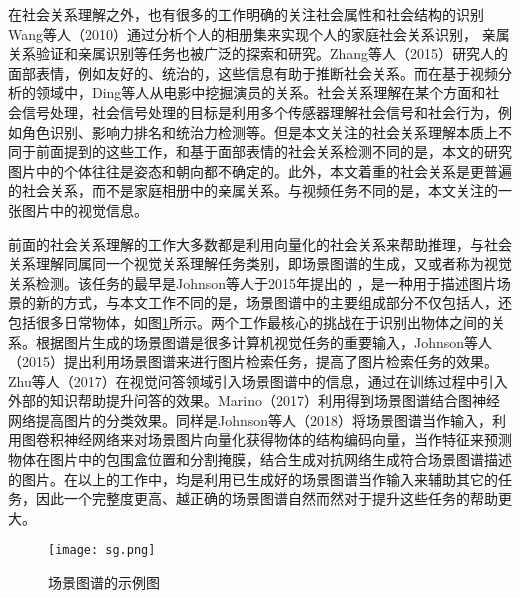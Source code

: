 在社会关系理解之外，也有很多的工作明确的关注社会属性和社会结构的识别Wang等人（2010）\cite{wang2010seeing}通过分析个人的相册集来实现个人的家庭社会关系识别，
亲属关系验证\cite{dibeklioglu2013like,fang2010towards,xia2012understanding}和亲属识别\cite{chen2012discovering,guo2014graph}等任务也被广泛的探索和研究。Zhang等人（2015）\cite{zhang2015learning}研究人的面部表情，例如友好的、统治的，这些信息有助于推断社会关系。而在基于视频分析的领域中，Ding等人\cite{ding2014learning}从电影中挖掘演员的关系。社会关系理解在某个方面和社会信号处理\cite{vinciarelli2009social}，社会信号处理的目标是利用多个传感器理解社会信号和社会行为，例如角色识别、影响力排名和统治力检测等\cite{hung2007using,rienks2006detection,salamin2009automatic}。但是本文关注的社会关系理解本质上不同于前面提到的这些工作，和基于面部表情的社会关系检测不同的是，本文的研究图片中的个体往往是姿态和朝向都不确定的。此外，本文着重的社会关系是更普遍的社会关系，而不是家庭相册中的亲属关系。与视频任务不同的是，本文关注的一张图片中的视觉信息。

前面的社会关系理解的工作大多数都是利用向量化的社会关系来帮助推理，与社会关系理解同属同一个视觉关系理解任务类别，即场景图谱的生成，又或者称为视觉关系检测。该任务的最早是Johnson等人于2015年提出的
\cite{johnson2015image}，是一种用于描述图片场景的新的方式，与本文工作不同的是，场景图谱中的主要组成部分不仅包括人，还包括很多日常物体，如图\ref{fig:sg-example}所示。两个工作最核心的挑战在于识别出物体之间的关系。根据图片生成的场景图谱是很多计算机视觉任务的重要输入，Johnson等人（2015）\cite{johnson2015image}提出利用场景图谱来进行图片检索任务，提高了图片检索任务的效果。Zhu等人（2017）\cite{zhu2017knowledge}在视觉问答领域引入场景图谱中的信息，通过在训练过程中引入外部的知识帮助提升问答的效果。Marino（2017）\cite{marino2017the}利用得到场景图谱结合图神经网络提高图片的分类效果。同样是Johnson等人（2018）\cite{johnson2018image}将场景图谱当作输入，利用图卷积神经网络来对场景图片向量化获得物体的结构编码向量，当作特征来预测物体在图片中的包围盒位置和分割掩膜，结合生成对抗网络生成符合场景图谱描述的图片。在以上的工作中，均是利用已生成好的场景图谱当作输入来辅助其它的任务，因此一个完整度更高、越正确的场景图谱自然而然对于提升这些任务的帮助更大。
\begin{figure}[htpb]
	\centering
	\texttt{[image: sg.png]}
    \caption{场景图谱\cite{xu2017scene}的示例图}
	\vspace*{-3.5mm}
	\label{fig:sg-example}
\end{figure}

